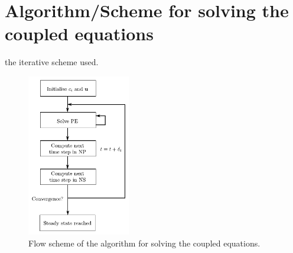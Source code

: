 \section{Algorithm/Scheme for solving the coupled equations}
the iterative scheme used.

\begin{figure}
\begin{center}
\includegraphics[width=0.4\textwidth]{fig/full_algorithm.pdf}
\end{center}
\caption{Flow scheme of the algorithm for solving the coupled equations.}
\label{fig:lbm:full_algo}
\end{figure}

